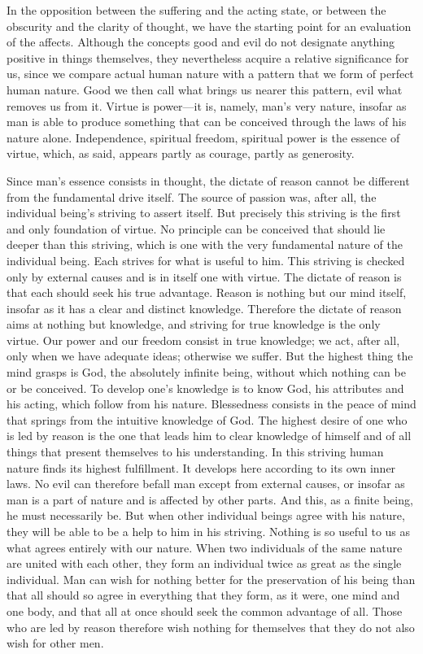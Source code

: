 \documentclass[12pt]{book}
\newcommand{\opage}[1]{\marginnote{\footnotesize\textit{[#1]}}}
\begin{document}
\opage{133}In the opposition between the suffering and the acting state, or between the
obscurity and the clarity of thought, we have the starting point for an evaluation of
the affects. Although the concepts good and evil do not designate anything positive in
things themselves, they nevertheless acquire a relative significance for us, since we
compare actual human nature with a pattern that we form of perfect human nature. Good we
then call what brings us nearer this pattern, evil what removes us from it. Virtue is
power---it is, namely, man's very nature, insofar as man is able to produce something
that can be conceived through the laws of his nature alone. Independence, spiritual
freedom, spiritual power is the essence of virtue, which, as said, appears partly as
courage, partly as generosity.

Since man's essence consists in thought, the dictate of reason cannot be different from
the fundamental drive itself. The source of passion was, after all, the individual
being's striving to assert itself. But precisely this striving is the first and only
foundation of virtue. No principle can be conceived that should lie deeper than this
striving, which is one with the very fundamental nature of the individual being. Each
strives for what is useful to him. This striving is checked only by external causes and
is in itself one with virtue. The dictate of reason is that each should seek his true
advantage. Reason is nothing but our mind itself, insofar as it has a clear and distinct
knowledge. Therefore the dictate of reason aims at nothing but knowledge, and striving
for true knowledge is the only virtue. Our power \opage{134}and our freedom consist in
true knowledge; we act, after all, only when we have adequate ideas; otherwise we
suffer. But the highest thing the mind grasps is God, the absolutely infinite being,
without which nothing can be or be conceived. To develop one's knowledge is to know God,
his attributes and his acting, which follow from his nature. Blessedness consists in the
peace of mind that springs from the intuitive knowledge of God. The highest desire of one
who is led by reason is the one that leads him to clear knowledge of himself and of all
things that present themselves to his understanding. In this striving human nature finds
its highest fulfillment. It develops here according to its own inner laws. No evil can
therefore befall man except from external causes, or insofar as man is a part of nature
and is affected by other parts. And this, as a finite being, he must necessarily be. But
when other individual beings agree with his nature, they will be able to be a help to
him in his striving. Nothing is so useful to us as what agrees entirely with our nature.
When two individuals of the same nature are united with each other, they form an
individual twice as great as the single individual. Man can wish for nothing better for
the preservation of his being than that all should so agree in everything that they
form, as it were, one mind and one body, and that all at once should seek the common
advantage of all. Those who are led by reason therefore wish nothing for themselves that
they do not also wish for other men.
\end{document}
